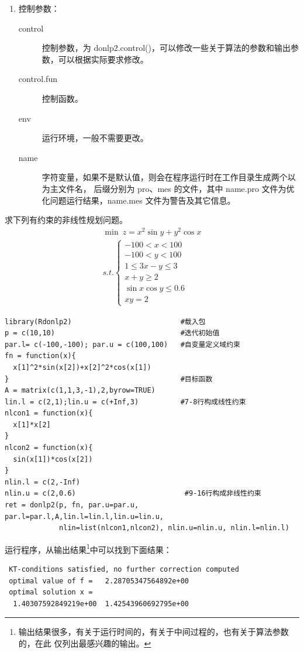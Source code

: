 \begin{enumerate}
\item 控制参数：
\begin{description}
\item[control]     控制参数，为 donlp2.control()，可以修改一些关于算法的参数和输出参数，可以根据实际要求修改。
\item[control.fun] 控制函数。
\item[env]  运行环境，一般不需要更改。
\item[name] 字符变量，如果不是默认值，则会在程序运行时在工作目录生成两个以  为主文件名，
            后缀分别为 pro、mes 的文件，其中 name.pro 文件为优化问题运行结果，name.mes 文件为警告及其它信息。
\end{description}
\end{enumerate}
 \begin{exmp}
求下列有约束的非线性规划问题。
\begin{equation*}
\begin{array}{l}
 \min \ z=x^2\sin y  + y^2\cos x  \\
 s.t.\left\{ \begin{array}{l}
  - 100 < x < 100 \\
  - 100 < y < 100 \\
  1\leqslant 3x - y   \leqslant 3\\
  x  + y   \geqslant 2\\
  \sin x\cos y \leqslant 0.6\\
  xy = 2
 \end{array} \right.
 \end{array}
\end{equation*}
 \end{exmp}
\begin{Verbatim}
library(Rdonlp2)                          #载入包
p = c(10,10)                              #迭代初始值
par.l= c(-100,-100); par.u = c(100,100)   #自变量定义域约束
fn = function(x){
  x[1]^2*sin(x[2])+x[2]^2*cos(x[1])
}                                         #目标函数
A = matrix(c(1,1,3,-1),2,byrow=TRUE)
lin.l = c(2,1);lin.u = c(+Inf,3)          #7-8行构成线性约束
nlcon1 = function(x){
  x[1]*x[2]
}
nlcon2 = function(x){
  sin(x[1])*cos(x[2])
}
nlin.l = c(2,-Inf)
nlin.u = c(2,0.6)                          #9-16行构成非线性约束
ret = donlp2(p, fn, par.u=par.u, par.l=par.l,A,lin.l=lin.l,lin.u=lin.u,
             nlin=list(nlcon1,nlcon2), nlin.u=nlin.u, nlin.l=nlin.l)
\end{Verbatim}

运行程序，从输出结果\footnote{输出结果很多，有关于运行时间的，有关于中间过程的，也有关于算法参数的，在此
仅列出最感兴趣的输出。}中可以找到下面结果：
\begin{Verbatim}
 KT-conditions satisfied, no further correction computed
 optimal value of f =   2.28705347564892e+00
 optimal solution x =
  1.40307592849219e+00  1.42543960692795e+00
\end{Verbatim}

